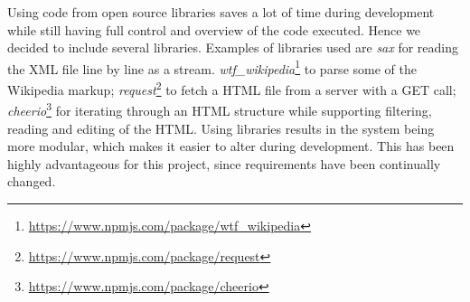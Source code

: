Using code from open source libraries saves a lot of time during development while still having full control and overview of the code executed. Hence we decided to include several libraries. Examples of libraries used are \textit{sax} for reading the XML file line by line as a stream.  \textit{wtf\_wikipedia}\footnote{\url{https://www.npmjs.com/package/wtf_wikipedia}} to parse some of the Wikipedia markup;  \textit{request}\footnote{\url{https://www.npmjs.com/package/request}} to fetch a HTML file from a server with a GET call;  \textit{cheerio}\footnote{\url{https://www.npmjs.com/package/cheerio}} for iterating through an HTML structure while supporting filtering, reading and editing of the HTML. Using libraries results in the system being more modular, which makes it easier to alter during development. This has been highly advantageous for this project, since requirements have been continually changed. 


\cleardoublepage